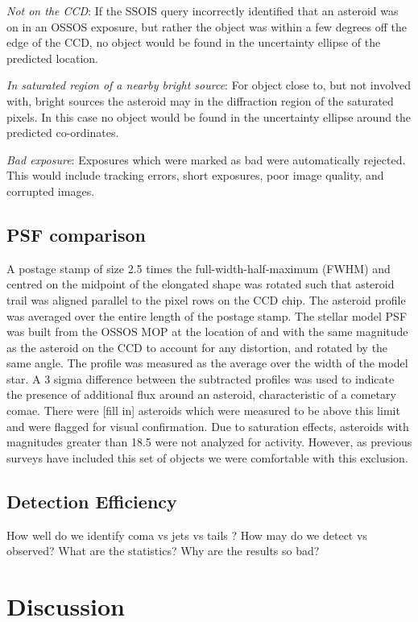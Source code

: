 \documentclass[iop,apj]{emulateapj}
\begin{document}
\textit{Not on the CCD}:
If the SSOIS query incorrectly identified that an asteroid was on in an OSSOS exposure, but rather the object was within a few degrees off the edge of the CCD, no object would be found in the uncertainty ellipse of the predicted location.

\textit{In saturated region of a nearby bright source}:
For object close to, but not involved with, bright sources the asteroid may in the diffraction region of the saturated pixels. In this case no object would be found in the uncertainty ellipse around the predicted co-ordinates.

\textit{Bad exposure}:
Exposures which were marked as bad were automatically rejected. This would include tracking errors, short exposures, poor image quality, and corrupted images. 

\subsection{PSF comparison}

A postage stamp of size 2.5 times the full-width-half-maximum (FWHM) and centred on the midpoint of the elongated shape was rotated such that asteroid trail was aligned parallel to the pixel rows on the CCD chip. The asteroid profile was averaged over the entire length of the postage stamp. The stellar model PSF was built from the OSSOS MOP at the location of and with the same magnitude as the asteroid on the CCD to account for any distortion, and rotated by the same angle.  The profile was measured as the average over the width of the model star. A 3 sigma difference between the subtracted profiles was used to indicate the presence of additional flux around an asteroid, characteristic of a cometary comae. There were [fill in] asteroids which were measured to be above this limit and were flagged for visual confirmation. Due to saturation effects, asteroids with magnitudes greater than 18.5 were not analyzed for activity. However, as previous surveys have included this set of objects \citep{hsieh15} we were comfortable with this exclusion.

\subsection{Detection Efficiency}

How well do we identify coma vs jets vs tails ? How may do we detect vs observed? What are the statistics? Why are the results so bad?

\section{Discussion}
\end{document}
